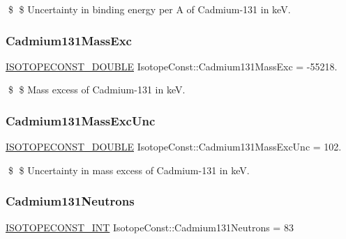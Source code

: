 \$ \$ Uncertainty in binding energy per A of Cadmium-\/131 in keV. \mbox{\label{group___isotope_const-_cadmium-_cd131_ga4db58c0bea992f55368b5bad37296059}} 
\subsubsection{\texorpdfstring{Cadmium131\+Mass\+Exc}{Cadmium131MassExc}}
{\footnotesize\ttfamily \mbox{\hyperlink{group___isotope_const-_macros_ga8f45a7272ce02c0b4c65c44636ed719a}{I\+S\+O\+T\+O\+P\+E\+C\+O\+N\+S\+T\+\_\+\+D\+O\+U\+B\+LE}} Isotope\+Const\+::\+Cadmium131\+Mass\+Exc = -\/55218.}

\$ \$ Mass excess of Cadmium-\/131 in keV. \mbox{\label{group___isotope_const-_cadmium-_cd131_ga68e9258c4cf70942b1cde3b75ccdd02d}} 
\subsubsection{\texorpdfstring{Cadmium131\+Mass\+Exc\+Unc}{Cadmium131MassExcUnc}}
{\footnotesize\ttfamily \mbox{\hyperlink{group___isotope_const-_macros_ga8f45a7272ce02c0b4c65c44636ed719a}{I\+S\+O\+T\+O\+P\+E\+C\+O\+N\+S\+T\+\_\+\+D\+O\+U\+B\+LE}} Isotope\+Const\+::\+Cadmium131\+Mass\+Exc\+Unc = 102.}

\$ \$ Uncertainty in mass excess of Cadmium-\/131 in keV. \mbox{\label{group___isotope_const-_cadmium-_cd131_ga63ba37ff1a65a59980b7689ae3b45521}} 
\subsubsection{\texorpdfstring{Cadmium131\+Neutrons}{Cadmium131Neutrons}}
{\footnotesize\ttfamily \mbox{\hyperlink{group___isotope_const-_macros_ga5f18360b3e99483a35c32d789e62621c}{I\+S\+O\+T\+O\+P\+E\+C\+O\+N\+S\+T\+\_\+\+I\+NT}} Isotope\+Const\+::\+Cadmium131\+Neutrons = 83}

